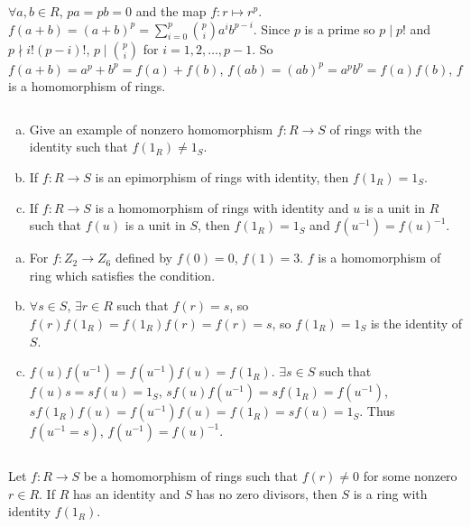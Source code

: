 \begin{answer}
    $\forall a,b\in R$, $pa=pb=0$ and the map $f:r\mapsto r^{p}$. $f(a+b)=(a+b)^{p}=\sum\limits_{i=0}^{p}\binom{p}{i}a^{i}b^{p-i}$. Since $p$ is a prime so $p\mid p!$ and $p\nmid i!(p-i)!$, $p\mid \binom{p}{i}$ for $i=1,2,\dots, p-1$. So $f(a+b)=a^{p}+b^{p}=f(a)+f(b)$, $f(ab)=(ab)^{p}=a^{p}b^{p}=f(a)f(b)$, $f$ is a homomorphism of rings.
\end{answer}

$$ $$

\begin{ex}
    \begin{enumerate}[(a)]
        \item Give an example of nonzero homomorphism $f:R\to S$ of rings with the identity such that $f(1_{R})\neq 1_{S}$.
        \item If $f:R\to S$ is an epimorphism of rings with identity, then $f(1_{R})=1_{S}$.
        \item If $f:R\to S$ is a homomorphism of rings with identity and $u$ is a unit in $R$ such that $f(u)$ is a unit in $S$, then $f(1_{R})=1_{S}$ and $f(u^{-1})=f(u)^{-1}$.
    \end{enumerate}
\end{ex}

\begin{answer}
    \begin{enumerate}[(a)]
        \item For $f:Z_{2}\to Z_{6}$ defined by $f(0)=0$, $f(1)=3$. $f$ is a homomorphism of ring which satisfies the condition.
        \item $\forall s\in S$, $\exists r\in R$ such that $f(r)=s$, so $f(r)f(1_{R})=f(1_{R})f(r)=f(r)=s$, so $f(1_{R})=1_{S}$ is the identity of $S$.
        \item $f(u)f(u^{-1})=f(u^{-1})f(u)=f(1_{R})$. $\exists s\in S$ such that $f(u)s=sf(u)=1_{S}$, $sf(u)f(u^{-1})=sf(1_{R})=f(u^{-1})$, $sf(1_{R})f(u)=f(u^{-1})f(u)=f(1_{R})=sf(u)=1_{S}$. Thus $f(u^{-1}=s)$, $f(u^{-1})=f(u)^{-1}$.
    \end{enumerate}
\end{answer}

$$ $$

\begin{ex}
    Let $f:R\to S$ be a homomorphism of rings such that $f(r)\neq 0$ for some nonzero $r\in R$. If $R$ has an identity and $S$ has no zero divisors, then $S$ is a ring with identity $f(1_{R})$.
\end{ex}

